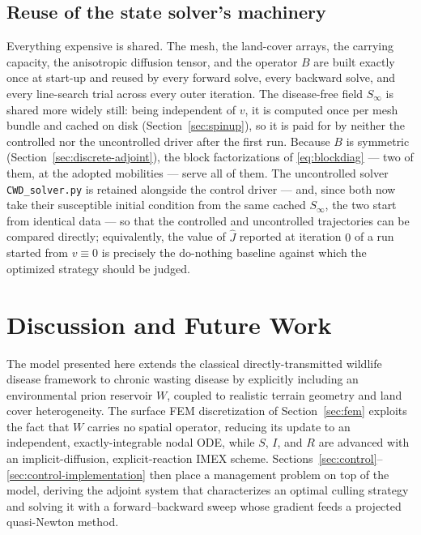 \documentclass[11pt]{article}
\begin{document}
\subsection{Reuse of the state solver's machinery}

Everything expensive is shared. The mesh, the land-cover arrays, the carrying capacity, the anisotropic diffusion tensor, and the operator $B$ are built exactly once at start-up and reused by every forward solve, every backward solve, and every line-search trial across every outer iteration. The disease-free field $S_\infty$ is shared more widely still: being independent of $v$, it is computed once per mesh bundle and cached on disk (Section~\ref{sec:spinup}), so it is paid for by neither the controlled nor the uncontrolled driver after the first run. Because $B$ is symmetric (Section~\ref{sec:discrete-adjoint}), the block factorizations of \eqref{eq:blockdiag} --- two of them, at the adopted mobilities --- serve all of them. The uncontrolled solver \texttt{CWD\_solver.py} is retained alongside the control driver --- and, since both now take their susceptible initial condition from the same cached $S_\infty$, the two start from identical data --- so that the controlled and uncontrolled trajectories can be compared directly; equivalently, the value of $\hat J$ reported at iteration $0$ of a run started from $v\equiv0$ is precisely the do-nothing baseline against which the optimized strategy should be judged.

\section{Discussion and Future Work}

The model presented here extends the classical directly-transmitted wildlife disease framework to chronic wasting disease by explicitly including an environmental prion reservoir $W$, coupled to realistic terrain geometry and land cover heterogeneity. The surface FEM discretization of Section~\ref{sec:fem} exploits the fact that $W$ carries no spatial operator, reducing its update to an independent, exactly-integrable nodal ODE, while $S$, $I$, and $R$ are advanced with an implicit-diffusion, explicit-reaction IMEX scheme. Sections~\ref{sec:control}--\ref{sec:control-implementation} then place a management problem on top of the model, deriving the adjoint system that characterizes an optimal culling strategy and solving it with a forward--backward sweep whose gradient feeds a projected quasi-Newton method.
\end{document}
